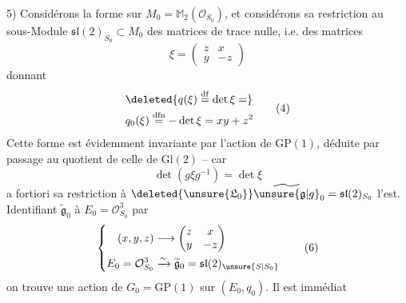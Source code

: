 5) Considérons la forme \inserted{$\xi\mapsto-\det(\unsure{\vert|\xi})$} sur $M_0=\mathbb M_2(\mathcal O_{S_0})$, et considérons sa restriction au sous-Module $\mathfrak{sl}(2)_{S_0}\subset M_0$ des matrices de trace nulle,  i.e. des matrices
\[
 \xi=\begin{pmatrix}z&x\\y&-z\end{pmatrix}\tag*{(3)}
\]
donnant
\[
 \begin{aligned}
 &\deleted{q(\xi)\overset{\mathrm{df}}{=}\det\xi=}\\
 &q_0(\xi)\overset{\mathrm{dfn}}{=}-\det\xi=xy+z^2
 \end{aligned}\tag*{(4)}
\]
Cette forme  est évidemment invariante par l'action de $\mathrm{GP}(1)$, déduite par passage au quotient de celle de $\mathrm{Gl}(2)$ -- car
\[
 \det(g\xi g^{-1})=\det\xi\tag*{(5)}
\]
a fortiori sa restriction à $\deleted{\unsure{\mathfrak L_0}}\widetilde{\unsure{\mathfrak g|g}}_0=\mathfrak{sl}(2)_{S_0}$ l'est. Identifiant $\widetilde{\mathfrak g}_0$ à $E_0=\mathcal O_{S_0}^3$ par
\[
 \left\{\begin{aligned}
 (x,y,z)&\longrightarrow\begin{pmatrix}z&x\\y&-z\end{pmatrix}\\
 E_0=\mathcal O_{S_0}^3&\xrightarrow{\sim}\widetilde{\mathfrak g}_0=\mathfrak{sl}(2)_{\unsure{S|S_0}}
 \end{aligned}\right.\tag*{(6)}
\]
on trouve une action de $G_0=\mathrm{GP}(1)$ sur $(E_0,q_0)$. Il est immédiat
